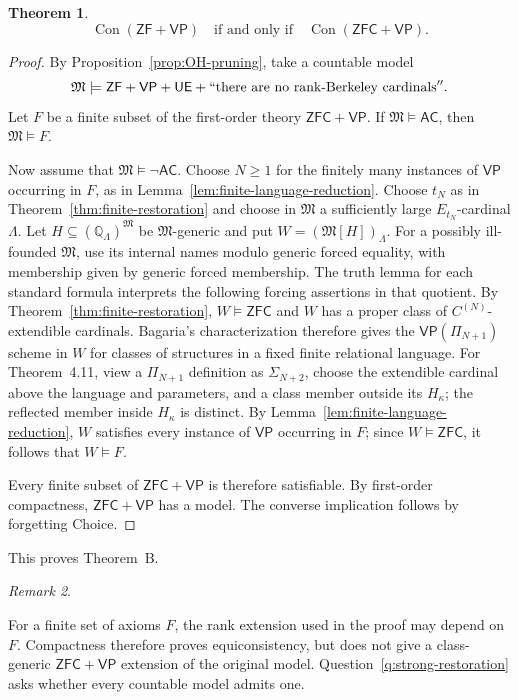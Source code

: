 \documentclass[11pt,a4paper]{amsart}
\newcommand{\VP}{\mathsf{VP}}
\newcommand{\AC}{\mathsf{AC}}
\newcommand{\ZF}{\mathsf{ZF}}
\newcommand{\ZFC}{\mathsf{ZFC}}
\newcommand{\Con}{\operatorname{Con}}
\newcommand{\UE}{\mathsf{UE}}
\theoremstyle{plain}
\newtheorem{theorem}{Theorem}[section]
\theoremstyle{definition}
\theoremstyle{remark}
\newtheorem{remark}[theorem]{Remark}
\begin{document}
\begin{theorem}\label{thm:consistency-transfer}
\[
\Con(\ZF+\VP)\quad\text{if and only if}\quad\Con(\ZFC+\VP).
\]
\end{theorem}

\begin{proof}
By Proposition~\ref{prop:OH-pruning}, take a countable model
\[
\mathfrak M\models\ZF+\VP+\UE+``\text{there are no rank-Berkeley cardinals}''.
\]
Let $F$ be a finite subset of the first-order theory $\ZFC+\VP$.  If $\mathfrak M\models\AC$, then $\mathfrak M\models F$.

Now assume that $\mathfrak M\models\neg\AC$.  Choose $N\geq1$ for the finitely many instances of $\VP$ occurring in $F$, as in Lemma~\ref{lem:finite-language-reduction}.  Choose $t_N$ as in Theorem~\ref{thm:finite-restoration} and choose in $\mathfrak M$ a sufficiently large $E_{t_N}$-cardinal $\Lambda$.  {\color{auditgreen}Let $H\subseteq(\mathbb Q_\Lambda)^{\mathfrak M}$ be $\mathfrak M$-generic and put $W=(\mathfrak M[H])_\Lambda$.  For a possibly ill-founded $\mathfrak M$, use its internal names modulo generic forced equality, with membership given by generic forced membership.  The truth lemma for each standard formula interprets the following forcing assertions in that quotient.}  By Theorem~\ref{thm:finite-restoration}, $W\models\ZFC$ and $W$ has a proper class of $C^{(N)}$-extendible cardinals.  {Bagaria's characterization \cite[Theorem~4.3(2), Corollary~4.7, Theorem~4.11, and the paragraph following Theorem~4.12]{BagariaCn} therefore gives the $\VP(\Pi_{N+1})$ scheme in $W$ for classes of structures in a fixed finite relational language.  {\color{auditgreen}For Theorem~4.11, view a $\Pi_{N+1}$ definition as $\Sigma_{N+2}$, choose the extendible cardinal above the language and parameters, and a class member outside its $H_\kappa$; the reflected member inside $H_\kappa$ is distinct.  By Lemma~\ref{lem:finite-language-reduction}, $W$ satisfies every instance of $\VP$ occurring in $F$;} since $W\models\ZFC$, it follows that $W\models F$.}

Every finite subset of $\ZFC+\VP$ is therefore satisfiable.  By first-order compactness, $\ZFC+\VP$ has a model.  The converse implication follows by forgetting Choice.
\end{proof}

This proves Theorem~B.

\begin{remark}\label{rem:consistency-not-uniform}

For a finite set of axioms $F$, the rank extension used in the proof may depend on $F$.  Compactness therefore proves equiconsistency, but does not give a class-generic $\ZFC+\VP$ extension of the original model.  Question~\ref{q:strong-restoration} asks whether every countable model admits one.
\end{remark}
\endgroup
\end{document}
